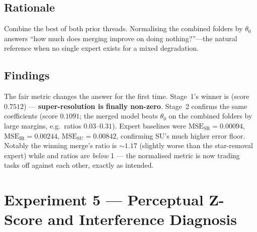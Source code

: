 \subsection*{Rationale}
Combine the best of both prior threads. Normalising the combined folders by
$\theta_0$ answers ``how much does merging improve on doing nothing?''---the
natural reference when no single expert exists for a mixed degradation.

\subsection*{Findings}
The fair metric changes the answer for the first time. Stage~1's winner is
\textbf{} (score $0.7512$) --- \textbf{super-resolution is
finally non-zero}. Stage~2 confirms the same coefficients (score $0.1091$; the
merged model beats $\theta_0$ on the combined folders by large margins, e.g.\
ratios $0.03$--$0.31$). Expert baselines were
$\mathrm{MSE}_{\mathrm{SR}}=0.00094$, $\mathrm{MSE}_{\mathrm{IR}}=0.00244$,
$\mathrm{MSE}_{\mathrm{SU}}=0.00842$, confirming SU's much higher error floor.
Notably the winning merge's \code{SR} ratio is $\sim 1.17$ (slightly worse than
the star-removal expert) while \code{IR} and \code{SU} ratios are \emph{below} 1
--- the normalised metric is now trading tasks off against each other, exactly
as intended.

\section{Experiment 5 --- Perceptual Z-Score and Interference Diagnosis}

